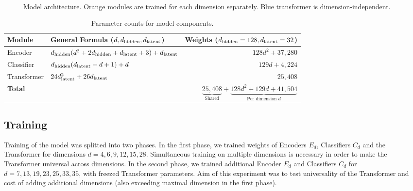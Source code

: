 \begin{figure}[htbp]
    \caption{Model architecture. Orange modules are trained for each dimension separately. Blue transformer is dimension-independent.}
    \label{fig:JordanNet}
\end{figure}

\begin{table}[htbp]
    \centering
    \small %
    \setlength{\tabcolsep}{4pt} %
    \renewcommand{\arraystretch}{1.3}
    \begin{tabular}{llr}
        \toprule
        \textbf{Module} & \textbf{General Formula ($d, d_{\mathrm{hidden}}, d_{\mathrm{latent}}$)} & \textbf{Weights ($d_{\mathrm{hidden}}=128, d_{\mathrm{latent}}=32$)} \\ 
        \midrule
        Encoder     & $d_{\mathrm{hidden}}(d^2 + 2d_{\mathrm{hidden}} + d_{\mathrm{latent}} + 3) + d_{\mathrm{latent}}$ & $128d^2 + 37,280$ \\ 
        Classifier  & $d_{\mathrm{hidden}}(d_{\mathrm{latent}} + d + 1) + d$                      & $129d + 4,224$    \\ 
        Transformer & $24d_{\mathrm{latent}}^2 + 26d_{\mathrm{latent}}$                           & $25,408$          \\ 
        \midrule
        \textbf{Total} & \multicolumn{2}{r}{%
            $\underbrace{25,408}_{\text{Shared}} + \underbrace{128d^2 + 129d + 41,504}_{\text{Per dimension } d}$%
        } \\ 
        \bottomrule
    \end{tabular}
    \caption{Parameter counts for model components.}
    \label{table:JordanNet_weights}
\end{table}

\subsection*{Training}
Training of the model was splitted into two phases. In the first phase, we trained weights of Encoders $E_d$, Classifiers $C_d$ and the Transformer for dimensions $d = 4, 6, 9, 12, 15, 28$. Simultaneous training on multiple dimensions is necessary in order to make the Transformer universal across dimensions. In the second phase, we trained additional Encoder $E_d$ and Classifiers $C_d$ for $d=7, 13, 19, 23, 25, 33, 35$, with freezed Transformer parameters. Aim of this experiment was to test universality of the Transformer and cost of adding additional dimensions (also exceeding maximal dimension in the first phase).

